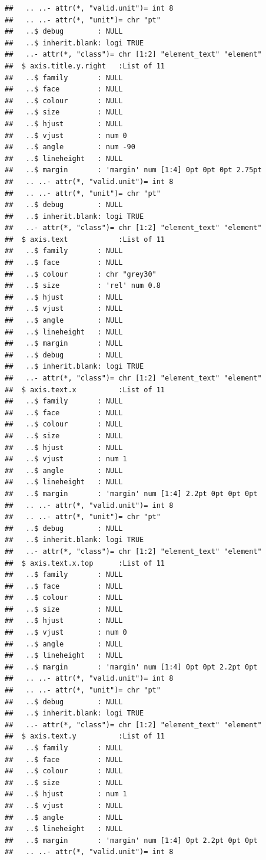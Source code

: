 \documentclass[]{article}
\begin{document}
\begin{verbatim}
##   .. ..- attr(*, "valid.unit")= int 8
##   .. ..- attr(*, "unit")= chr "pt"
##   ..$ debug        : NULL
##   ..$ inherit.blank: logi TRUE
##   ..- attr(*, "class")= chr [1:2] "element_text" "element"
##  $ axis.title.y.right   :List of 11
##   ..$ family       : NULL
##   ..$ face         : NULL
##   ..$ colour       : NULL
##   ..$ size         : NULL
##   ..$ hjust        : NULL
##   ..$ vjust        : num 0
##   ..$ angle        : num -90
##   ..$ lineheight   : NULL
##   ..$ margin       : 'margin' num [1:4] 0pt 0pt 0pt 2.75pt
##   .. ..- attr(*, "valid.unit")= int 8
##   .. ..- attr(*, "unit")= chr "pt"
##   ..$ debug        : NULL
##   ..$ inherit.blank: logi TRUE
##   ..- attr(*, "class")= chr [1:2] "element_text" "element"
##  $ axis.text            :List of 11
##   ..$ family       : NULL
##   ..$ face         : NULL
##   ..$ colour       : chr "grey30"
##   ..$ size         : 'rel' num 0.8
##   ..$ hjust        : NULL
##   ..$ vjust        : NULL
##   ..$ angle        : NULL
##   ..$ lineheight   : NULL
##   ..$ margin       : NULL
##   ..$ debug        : NULL
##   ..$ inherit.blank: logi TRUE
##   ..- attr(*, "class")= chr [1:2] "element_text" "element"
##  $ axis.text.x          :List of 11
##   ..$ family       : NULL
##   ..$ face         : NULL
##   ..$ colour       : NULL
##   ..$ size         : NULL
##   ..$ hjust        : NULL
##   ..$ vjust        : num 1
##   ..$ angle        : NULL
##   ..$ lineheight   : NULL
##   ..$ margin       : 'margin' num [1:4] 2.2pt 0pt 0pt 0pt
##   .. ..- attr(*, "valid.unit")= int 8
##   .. ..- attr(*, "unit")= chr "pt"
##   ..$ debug        : NULL
##   ..$ inherit.blank: logi TRUE
##   ..- attr(*, "class")= chr [1:2] "element_text" "element"
##  $ axis.text.x.top      :List of 11
##   ..$ family       : NULL
##   ..$ face         : NULL
##   ..$ colour       : NULL
##   ..$ size         : NULL
##   ..$ hjust        : NULL
##   ..$ vjust        : num 0
##   ..$ angle        : NULL
##   ..$ lineheight   : NULL
##   ..$ margin       : 'margin' num [1:4] 0pt 0pt 2.2pt 0pt
##   .. ..- attr(*, "valid.unit")= int 8
##   .. ..- attr(*, "unit")= chr "pt"
##   ..$ debug        : NULL
##   ..$ inherit.blank: logi TRUE
##   ..- attr(*, "class")= chr [1:2] "element_text" "element"
##  $ axis.text.y          :List of 11
##   ..$ family       : NULL
##   ..$ face         : NULL
##   ..$ colour       : NULL
##   ..$ size         : NULL
##   ..$ hjust        : num 1
##   ..$ vjust        : NULL
##   ..$ angle        : NULL
##   ..$ lineheight   : NULL
##   ..$ margin       : 'margin' num [1:4] 0pt 2.2pt 0pt 0pt
##   .. ..- attr(*, "valid.unit")= int 8

\end{verbatim}
\end{document}
